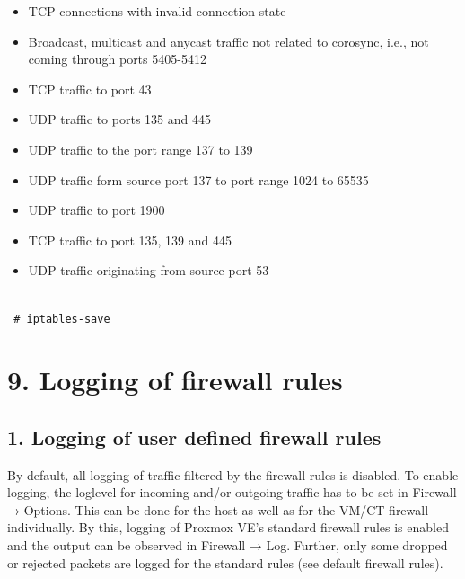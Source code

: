 \begin{itemize}[leftmargin=2cm]

	\item TCP connections with invalid connection state

	\item Broadcast, multicast and anycast traffic not related to corosync, i.e., not coming through ports 5405-5412

	\item TCP traffic to port 43

	\item UDP traffic to ports 135 and 445

	\item UDP traffic to the port range 137 to 139

	\item UDP traffic form source port 137 to port range 1024 to 65535

	\item UDP traffic to port 1900

	\item TCP traffic to port 135, 139 and 445

	\item UDP traffic originating from source port 53

\end{itemize}

\begin{lstlisting}

 # iptables-save

\end{lstlisting}


\section{9. Logging of firewall rules}

\subsection{1. Logging of user defined firewall rules}

By default, all logging of traffic filtered by the firewall rules is disabled. To enable logging, the loglevel for incoming and/or outgoing traffic has to be set in Firewall → Options. This can be done for the host as well as for the VM/CT firewall individually. By this, logging of Proxmox VE’s standard firewall rules is enabled and the output can be observed in Firewall → Log. Further, only some dropped or rejected packets are logged for the standard rules (see default firewall rules).


